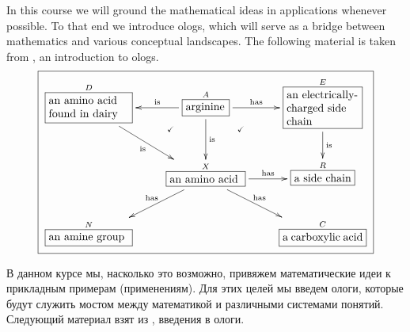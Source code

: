 \documentclass[a4paper]{book}
\def\tn{\textnormal}
\def\rr{\raggedright}
\newcommand{\LA}[2]{\ar[#1]^-{\tn {#2}}}
\newcommand{\LAL}[2]{\ar[#1]_-{\tn {#2}}}
\newcommand{\obox}[3]{\stackrel{#1}{\fbox{\parbox{#2}{#3}}}}
\newcommand{\mebox}[2]{\obox{#1}{1in}{#2}}
\newcommand{\smbox}[2]{\stackrel{#1}{\fbox{#2}}}
\theoremstyle{myth}
\begin{document}
\begin{russian}
In this course we will ground the mathematical ideas in applications whenever possible. To that end we introduce ologs, which will serve as a bridge between mathematics and various conceptual landscapes. The following material is taken from \cite{SK}, an introduction to ologs.
\begin{align}\label{dia:arginine}\fbox{\xymatrixnocompile{\obox{D}{1in}{\rr an amino acid found in dairy}\LAL{dr}{is}&\obox{A}{.5in}{arginine}\ar@{}[dl]|(.3){\checkmark}\ar@{}[dr]|(.3){\checkmark}\LA{r}{has}\LAL{l}{is}\LA{d}{is}&\obox{E}{.9in}{\rr an electrically-charged side chain}\LA{d}{is}\\&\obox{X}{.9in}{an amino acid}\LAL{dl}{has}\LA{dr}{has}\LA{r}{has}&\smbox{R}{a side chain}\\\mebox{N}{an amine group}&&\mebox{C}{a carboxylic acid}}}\end{align}  

В данном курсе мы, насколько это возможно, привяжем математические идеи к прикладным примерам (применениям). Для этих целей мы введем ологи, которые будут служить мостом между математикой и различными системами понятий. Следующий материал взят из \cite{SK}, введения в ологи.%
\end{russian}
\end{document}
